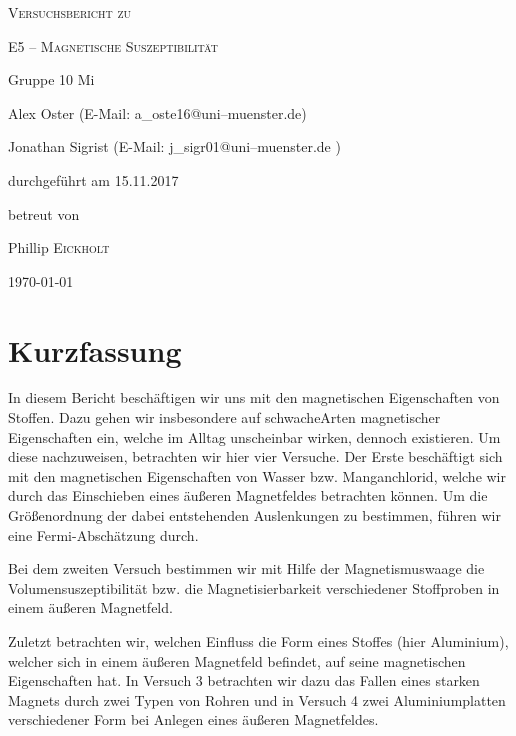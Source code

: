 \documentclass[11pt,a4paper,titlepage, ngerman]{article}
\begin{document}
	\begin{titlepage}
		\centering
		{\scshape\LARGE Versuchsbericht zu \par}
		\vspace{1cm}
		{\scshape\huge E5 -- Magnetische Suszeptibilität\par}
		\vspace{2.5cm}
		{\LARGE Gruppe 10 Mi\par}
		\vspace{0.5cm}
		{\large Alex Oster (E-Mail: a\_oste16@uni--muenster.de) \par}
		{\large Jonathan Sigrist (E-Mail: j\_sigr01@uni--muenster.de ) \par}
		\vfill
		durchgeführt am 15.11.2017\par
		betreut von\par
		{\large Phillip \textsc{Eickholt}}		
		\vfill	
		{\large \today\par}
	\end{titlepage}
		
	\tableofcontents
		
	\newpage
	
	\section{Kurzfassung}
		
		In diesem Bericht beschäftigen wir uns mit den magnetischen Eigenschaften von Stoffen. Dazu gehen wir insbesondere auf \glqq schwache\grqq Arten magnetischer Eigenschaften ein, welche im Alltag unscheinbar wirken, dennoch existieren.
		Um diese nachzuweisen, betrachten wir hier vier Versuche. Der Erste beschäftigt sich mit den magnetischen Eigenschaften von Wasser bzw. Manganchlorid, welche wir durch das Einschieben eines äußeren Magnetfeldes betrachten können. Um die Größenordnung der dabei entstehenden Auslenkungen zu bestimmen, führen wir eine Fermi-Abschätzung durch.
		
		Bei dem zweiten Versuch bestimmen wir mit Hilfe der Magnetismuswaage die Volumensuszeptibilität bzw. die Magnetisierbarkeit verschiedener Stoffproben in einem äußeren Magnetfeld. 
		
		Zuletzt betrachten wir, welchen Einfluss die Form eines Stoffes (hier Aluminium), welcher sich in einem äußeren Magnetfeld befindet, auf seine magnetischen Eigenschaften hat. In Versuch 3 betrachten wir dazu das Fallen eines starken Magnets durch zwei Typen von Rohren und in Versuch 4 zwei Aluminiumplatten verschiedener Form bei Anlegen eines äußeren Magnetfeldes.		
\end{document}
